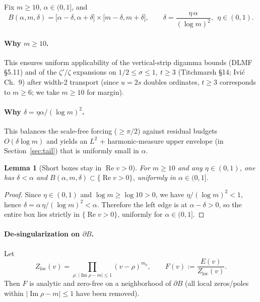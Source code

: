 \documentclass[11pt]{article}
\numberwithin{equation}{section}
\newtheorem{lemma}[theorem]{Lemma}
\theoremstyle{remark}
\DeclareMathOperator{\Imag}{Im}
\DeclareMathOperator{\Real}{Re}
\newcommand{\Zloc}{Z_{\mathrm{loc}}}
\begin{document}
Fix $m\ge 10$, $\alpha\in(0,1]$, and
\begin{equation}\label{eq:box-delta}
B(\alpha,m,\delta)=\big[\alpha-\delta,\alpha+\delta\big]\times\big[m-\delta,m+\delta\big],
\qquad
\delta=\frac{\eta\,\alpha}{(\log m)^2},\ \ \eta\in(0,1).
\end{equation}

\paragraph{Why $m\ge 10$.}
This ensures uniform applicability of the vertical-strip digamma bounds (DLMF §5.11) and of the $\zeta'/\zeta$ expansions on $1/2\le\sigma\le1,\ t\ge 3$ (Titchmarsh §14; Ivi\'c Ch.~9) after width-2 transport (since $u=2s$ doubles ordinates, $t\ge3$ corresponds to $m\ge 6$; we take $m\ge10$ for margin).

\paragraph{Why $\delta=\eta\alpha/(\log m)^2$.}
This balances the scale-free forcing ($\ge\pi/2$) against residual budgets $O(\delta\log m)$ and yields an $L^2$ + harmonic-measure upper envelope (in Section~\ref{sec:tail}) that is uniformly small in $\alpha$. %

\begin{lemma}[Short boxes stay in $\Real v>0$]\label{lem:box-right}
For $m\ge10$ and any $\eta\in(0,1)$, one has $\delta<\alpha$ and $B(\alpha,m,\delta)\subset\{\Real v>0\}$, uniformly in $\alpha\in(0,1]$.
\end{lemma}
\begin{proof}
Since $\eta\in(0,1)$ and $\log m\ge\log 10>0$, we have $\eta/(\log m)^2<1$, hence $\delta=\alpha\,\eta/(\log m)^2<\alpha$. Therefore the left edge is at $\alpha-\delta>0$, so the entire box lies strictly in $\{\Real v>0\}$, uniformly for $\alpha\in(0,1]$.
\end{proof}

\paragraph{De-singularization on $\partial B$.}
Let
\begin{equation}\label{eq:Zloc}
\Zloc(v)=\prod_{\rho:\,|\Imag\rho-m|\le 1}(v-\rho)^{m_\rho},\qquad
F(v):=\frac{E(v)}{\Zloc(v)}.
\end{equation}
Then $F$ is analytic and zero-free on a neighborhood of $\partial B$ (all local zeros/poles within $|\Imag\rho-m|\le 1$ have been removed).
\end{document}
